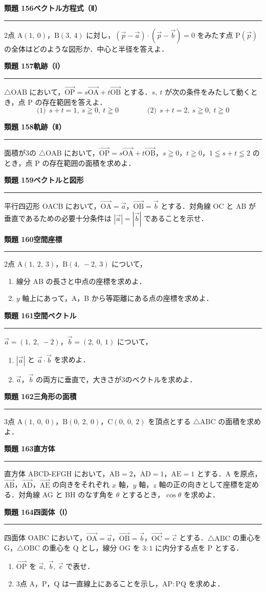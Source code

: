 \documentclass[a4paper,11pt]{ltjsarticle}
\newcommand{\mon}[2]{\Needspace{7\baselineskip}\vspace{10pt}%
  {\sffamily\bfseries 類題 #1\quad #2\par}\vspace{2pt}\hrule\vspace{4pt}}
\begin{document}
\mon{156}{ベクトル方程式（Ⅱ）}
2点 $\mathrm A(1,\ 0)$，$\mathrm B(3,\ 4)$ に対し，$(\vec p-\vec a)\cdot(\vec p-\vec b)=0$ をみたす点 $\mathrm P(\vec p)$ の全体はどのような図形か．中心と半径を答えよ．

\mon{157}{軌跡（Ⅰ）}
$\triangle\mathrm{OAB}$ において，$\overrightarrow{\mathrm{OP}}=s\overrightarrow{\mathrm{OA}}+t\overrightarrow{\mathrm{OB}}$ とする．$s,\ t$ が次の条件をみたして動くとき，点 P の存在範囲を答えよ．
\[\text{(1)}\ \ s+t=1,\ s\geqq0,\ t\geqq0\qquad\qquad\text{(2)}\ \ s+t=2,\ s\geqq0,\ t\geqq0\]

\mon{158}{軌跡（Ⅱ）}
面積が3の $\triangle\mathrm{OAB}$ において，$\overrightarrow{\mathrm{OP}}=s\overrightarrow{\mathrm{OA}}+t\overrightarrow{\mathrm{OB}}$，$s\geqq0$，$t\geqq0$，$1\leqq s+t\leqq2$ のとき，点 P の存在範囲の面積を求めよ．

\mon{159}{ベクトルと図形}
平行四辺形 OACB において，$\overrightarrow{\mathrm{OA}}=\vec a$，$\overrightarrow{\mathrm{OB}}=\vec b$ とする．対角線 OC と AB が垂直であるための必要十分条件は $|\vec a|=|\vec b|$ であることを示せ．

\mon{160}{空間座標}
2点 $\mathrm A(1,\ 2,\ 3)$，$\mathrm B(4,\ -2,\ 3)$ について，
\begin{enumerate}
\item 線分 AB の長さと中点の座標を求めよ．
\item $y$ 軸上にあって，A，B から等距離にある点の座標を求めよ．
\end{enumerate}

\mon{161}{空間ベクトル}
$\vec a=(1,\ 2,\ -2)$，$\vec b=(2,\ 0,\ 1)$ について，
\begin{enumerate}
\item $|\vec a|$ と $\vec a\cdot\vec b$ を求めよ．
\item $\vec a$，$\vec b$ の両方に垂直で，大きさが3のベクトルを求めよ．
\end{enumerate}

\mon{162}{三角形の面積}
3点 $\mathrm A(1,\ 0,\ 0)$，$\mathrm B(0,\ 2,\ 0)$，$\mathrm C(0,\ 0,\ 2)$ を頂点とする $\triangle\mathrm{ABC}$ の面積を求めよ．

\mon{163}{直方体}
直方体 ABCD-EFGH において，$\mathrm{AB}=2$，$\mathrm{AD}=1$，$\mathrm{AE}=1$ とする．A を原点，$\overrightarrow{\mathrm{AB}}$，$\overrightarrow{\mathrm{AD}}$，$\overrightarrow{\mathrm{AE}}$ の向きをそれぞれ $x$ 軸，$y$ 軸，$z$ 軸の正の向きとして座標を定める．対角線 AG と BH のなす角を $\theta$ とするとき，$\cos\theta$ を求めよ．

\mon{164}{四面体（Ⅰ）}
四面体 OABC において，$\overrightarrow{\mathrm{OA}}=\vec a$，$\overrightarrow{\mathrm{OB}}=\vec b$，$\overrightarrow{\mathrm{OC}}=\vec c$ とする．$\triangle\mathrm{ABC}$ の重心を G，$\triangle\mathrm{OBC}$ の重心を Q とし，線分 OG を $3:1$ に内分する点を P とする．
\begin{enumerate}
\item $\overrightarrow{\mathrm{OP}}$ を $\vec a,\ \vec b,\ \vec c$ で表せ．
\item 3点 A，P，Q は一直線上にあることを示し，$\mathrm{AP}:\mathrm{PQ}$ を求めよ．
\end{enumerate}
\end{document}
